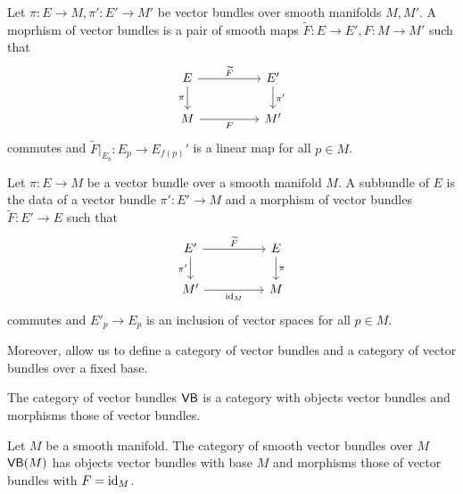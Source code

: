 \begin{definition}\label{def: morphism of vector bundles}
    Let $\pi:E\to M, \pi':E'\to M'$ be vector bundles over smooth manifolds $M,M'$. A moprhism of vector bundles is a pair of smooth maps $\widetilde{F}:E\to E', F:M\to M'$ such that 
    $$%
    \begin{tikzcd}
        E && {E'} \\
        M && {M'}
        \arrow["{\widetilde{F}}", from=1-1, to=1-3]
        \arrow["\pi"', from=1-1, to=2-1]
        \arrow["{\pi'}", from=1-3, to=2-3]
        \arrow["F"', from=2-1, to=2-3]
    \end{tikzcd}$$
    commutes and $\widetilde{F}|_{E_{b}}:E_{p}\to E_{f(p)}'$ is a linear map for all $p\in M$. 
\end{definition}
\begin{definition}[Subbundle]\label{def: subbundle}
    Let $\pi:E\to M$ be a vector bundle over a smooth manifold $M$. A subbundle of $E$ is the data of a vector bundle $\pi':E'\to M$ and a morphism of vector bundles $\widetilde{F}:E'\to E$ such that 
    $$%
    \begin{tikzcd}
        {E'} && E \\
        {M'} && M
        \arrow["{\widetilde{F}}", from=1-1, to=1-3]
        \arrow["{\pi'}"', from=1-1, to=2-1]
        \arrow["\pi", from=1-3, to=2-3]
        \arrow["\id_{M}"', from=2-1, to=2-3]
    \end{tikzcd}$$
    commutes and $E'_{p}\to E_{p}$ is an inclusion of vector spaces for all $p\in M$.
\end{definition}
Moreover,  allow us to define a category of vector bundles and a category of vector bundles over a fixed base. 
\begin{definition}\label{def: category of vector bundles}
    The category of vector bundles $\mathsf{VB}$ is a category with objects vector bundles and morphisms those of vector bundles. 
\end{definition}
\begin{definition}\label{def: category of vector bundles with fixed base}
    Let $M$ be a smooth manifold. The category of smooth vector bundles over $M$ $\mathsf{VB}(M)$ has objects vector bundles with base $M$ and morphisms those of vector bundles with $F=\mathrm{id}_{M}$. 
\end{definition}
